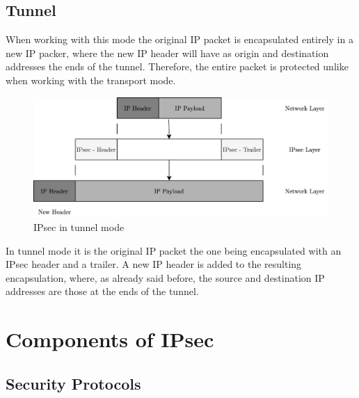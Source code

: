 \documentclass[11pt]{book}
\begin{document}
\subsection{Tunnel}
When working with this mode the original IP packet is encapsulated entirely in a new IP packer, where the new IP header will have as origin and destination addresses the ends of the tunnel. Therefore, the entire packet is protected unlike when working with the transport mode. 
\begin{figure}[H]
	\centering
	\includegraphics [scale=0.165] {tunnel_encapsulation.png}
	\caption{IPsec in tunnel mode}
\end{figure}
In tunnel mode it is the original IP packet the one being encapsulated with an IPsec header and a trailer. A new IP header is added to the resulting encapsulation, where, as already said before, the source and destination IP addresses are those at the ends of the tunnel.
\section{Components of IPsec}
\subsection{Security Protocols}
\end{document}

